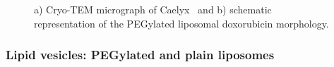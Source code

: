 \begin{figure}
	\centering
		\caption[Cryo-TEM micrograph and schematic representation of Caelyx.]{a) Cryo-TEM micrograph of Caelyx\textregistered\ \citep{barenholz_doxil-first_2012} and b) schematic representation of the PEGylated liposomal doxorubicin morphology.}
\end{figure}


%		

\subsubsection{Lipid vesicles: PEGylated and plain liposomes}
\label{sec:materials_liposome}

